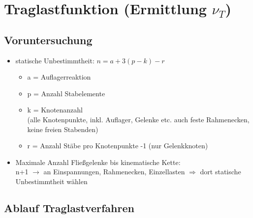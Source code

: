 \documentclass[fleqn,twoside]{article}
\begin{document}
\section{Traglastfunktion (Ermittlung $\nu_T$)}

    \subsection{Voruntersuchung}

        \begin{itemize}
            \item statische Unbestimmtheit: $n = a + 3(p-k)-r$
                \begin{itemize}
                    \item a = Auflagerreaktion
                    \item p = Anzahl Stabelemente
                    \item k = Knotenanzahl \\ (alle Knotenpunkte, inkl. Auflager, Gelenke etc. auch feste Rahmenecken, keine freien Stabenden)
                    \item r = Anzahl Stäbe pro Knotenpunkte -1 (nur Gelenkknoten)
                \end{itemize}

            \item Maximale Anzahl Fließgelenke bis kinematische Kette:\\
            n+1 $\rightarrow$ an Einspannungen, Rahmenecken, Einzellasten $\Rightarrow$ dort statische Unbestimmtheit wählen
        \end{itemize}

    \subsection{Ablauf Traglastverfahren}
\end{document}

